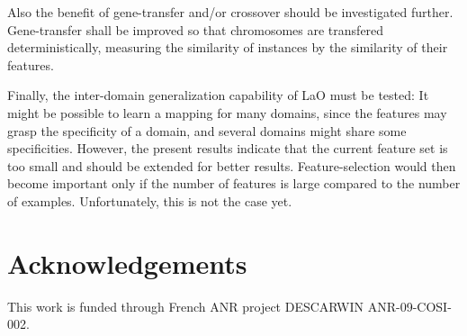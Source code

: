 \documentclass[runningheads,a4paper]{llncs}
\begin{document}
Also the benefit of gene-transfer and/or crossover should be investigated further. Gene-transfer shall be improved so that chromosomes are transfered deterministically, measuring the similarity of instances by the similarity of their features.

Finally, the inter-domain generalization capability of LaO must be tested: It might be possible to learn a mapping for many domains, since the features may grasp the specificity of a domain, and several domains might share some specificities. However, the present results indicate that the current feature set is too small and should be extended for better results. Feature-selection would then become important only if the number of features is large compared to the number of examples. Unfortunately, this is not the case yet.\\


\section{Acknowledgements}
This work is funded through French ANR project DESCARWIN ANR-09-COSI-002.




\end{document}
